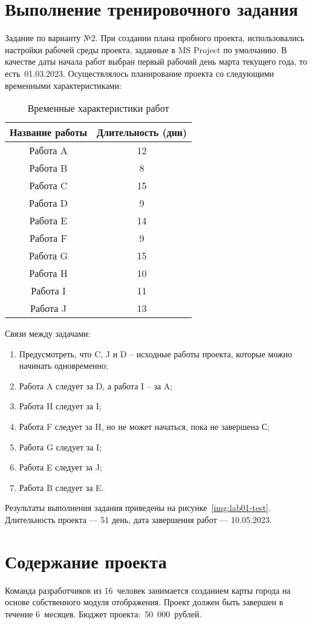 \section{Выполнение тренировочного задания}

Задание по варианту №2. При создании плана пробного проекта, использовались
настройки рабочей среды проекта, заданные в MS Project по умолчанию. В качестве
даты начала работ выбран первый рабочий день марта текущего года, то
есть~01.03.2023. Осуществлялось планирование проекта со следующими временными
характеристиками:

{
\captionsetup{format=hang,justification=raggedleft,
              singlelinecheck=off,width=17cm}
\begin{longtable}[Hc]{|c|c|}
\caption{Временные характеристики работ}\\
    \hline
    Название работы & Длительность (дни)\\
    \hline
    Работа A & 12\\
    \hline
    Работа B & 8\\
    \hline
    Работа C & 15\\
    \hline
    Работа D & 9\\
    \hline
    Работа E & 14\\
    \hline
    Работа F & 9\\
    \hline
    Работа G & 15\\
    \hline
    Работа H & 10\\
    \hline
    Работа I & 11\\
    \hline
    Работа J & 13\\
    \hline
\end{longtable}
}

Связи между задачами:

\begin{enumerate}
    \item Предусмотреть, что C, J и D – исходные работы проекта, которые можно начинать одновременно;
    \item Работа A следует за D, а работа I – за A;
    \item Работа H следует за I;
    \item Работа F следует за H, но не может начаться, пока не завершена С;
    \item Работа G следует за I;
    \item Работа E следует за J;
    \item Работа B следует за E.
\end{enumerate}

Результаты выполнения задания приведены на рисунке~\ref{img:lab01-test}.
Длительность проекта --- 51 день, дата завершения работ --- 10.05.2023.


\section{Содержание проекта}

Команда разработчиков из 16~человек занимается созданием карты города на основе
собственного модуля отображения. Проект должен быть завершен в течение
6~месяцев. Бюджет проекта:~50~000~рублей.
